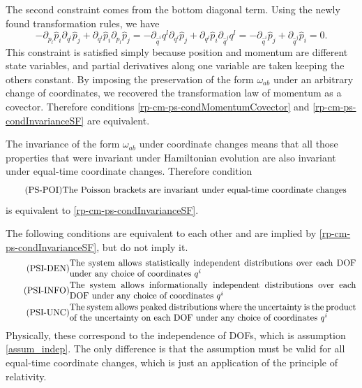 The second constraint comes from the bottom diagonal term. Using the newly found transformation rules, we have
\begin{equation}
	- \partial_{p_l} \hat{p}_i \partial_{q^l} \hat{p}_j +  \partial_{q^l} \hat{p}_i \partial_{p_l} \hat{p}_j = - \partial_{\hat{q}^i} q^l \partial_{q^l} \hat{p}_j +  \partial_{q^l} \hat{p}_i \partial_{\hat{q}^j} q^l = - \partial_{\hat{q}^i} \hat{p}_j + \partial_{\hat{q}^j} \hat{p}_i = 0.
\end{equation}
This constraint is satisfied simply because position and momentum are different state variables, and partial derivatives along one variable are taken keeping the others constant. By imposing the preservation of the form $\omega_{ab}$ under an arbitrary change of coordinates, we recovered the transformation law of momentum as a covector. Therefore conditions \ref{rp-cm-ps-condMomentumCovector} and \ref{rp-cm-ps-condInvarianceSF} are equivalent.

The invariance of the form $\omega_{ab}$ under coordinate changes means that all those properties that were invariant under Hamiltonian evolution are also invariant under equal-time coordinate changes. Therefore condition
\begin{equation}
	\tag{PS-POI}\label{rp-cm-ps-condInvariancePoisson}
	\eqtext{The Poisson brackets are invariant under equal-time coordinate changes} \\
\end{equation}
is equivalent to \ref{rp-cm-ps-condInvarianceSF}.

The following conditions are equivalent to each other and are implied by \ref{rp-cm-ps-condInvarianceSF}, but do not imply it.
\begin{align}
	\tag{PSI-DEN}\label{rp-cm-psi-condInvarianceIndepDensities}
	&\eqtext{The system allows statistically independent distributions over each DOF under any choice of coordinates $q^i$} \\
	\tag{PSI-INFO}\label{rp-cm-psi-condInvarianceIndepEntropy}
	&\eqtext{The system allows informationally independent distributions over each DOF under any choice of coordinates $q^i$} \\
	\tag{PSI-UNC}\label{rp-cm-psi-condInvarianceIndepUncertainty}
	&\eqtext{The system allows peaked distributions where the uncertainty is the product of the uncertainty on each DOF under any choice of coordinates $q^i$}
\end{align}
Physically, these correspond to the independence of DOFs, which is assumption \ref{assum_indep}. The only difference is that the assumption must be valid for all equal-time coordinate changes, which is just an application of the principle of relativity.

